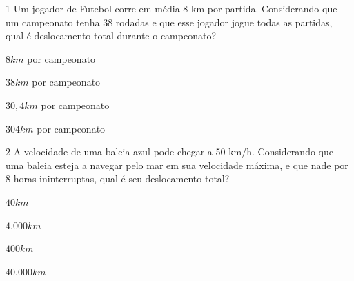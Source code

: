 \num{1} Um jogador de Futebol corre em média 8 km por partida. Considerando
que um campeonato tenha 38 rodadas e que esse jogador jogue todas as
partidas, qual é deslocamento total durante o campeonato?

\begin{escolha}[itemsep=0pt]
\item $8 km$ por campeonato
\item $38 km$ por campeonato
\item $30,4 km$ por campeonato
\item $304 km$ por campeonato 
\end{escolha}







\num{2} A velocidade de uma baleia azul pode chegar a 50 km/h. Considerando
que uma baleia esteja a navegar pelo mar em sua velocidade máxima, e que
nade por 8 horas ininterruptas, qual é seu deslocamento total?

\begin{escolha}[itemsep=0pt]
\item $40 km$
\item $4.000 km$
\item $400 km$ 
\item $40.000 km$
\end{escolha}



